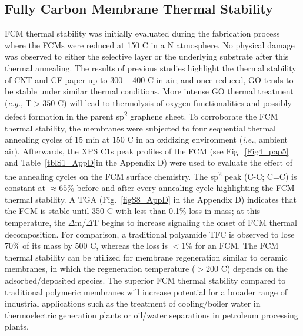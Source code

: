 \subsection{Fully Carbon Membrane Thermal Stability}
FCM thermal stability was initially evaluated during the fabrication process where the FCMs were reduced at 150 \textdegree C in a N atmosphere. No physical damage was observed to either the selective layer or the underlying substrate after this thermal annealing. The results of previous studies highlight the thermal stability of CNT and CF paper up to  $300-400$ \textdegree C in air;\cite{hordy2014high} and once reduced, GO tends to be stable under similar thermal conditions. More intense GO thermal treatment (\textit{e.g.}, T$>350$ \textdegree C) will lead to thermolysis of oxygen functionalities and possibly defect formation in the parent sp\textsuperscript{2} graphene sheet.\cite{bagri2010structural} To corroborate the FCM thermal stability,  the membranes were subjected to four sequential thermal annealing cycles of 15 min at 150 \textdegree C in an oxidizing environment (\textit{i.e.}, ambient air). Afterwards, the XPS C1s peak profiles of the FCM (see Fig.~\ref{Fig4_pap5} and Table~\ref{tblS1_AppD}in the Appendix D) were used to evaluate the effect of the annealing cycles on the FCM surface chemistry. The sp\textsuperscript{2} peak (C-C; C=C) is constant at $\approx65$\% before and after every annealing cycle highlighting the FCM thermal stability. A TGA (Fig.~\ref{figS8_AppD} in the Appendix D) indicates that the FCM is stable until 350 \textdegree C with less than 0.1\% loss in mass; at this temperature, the $\Delta$m/$\Delta$T begins to increase signaling the onset of FCM thermal decomposition. For comparison, a traditional polyamide TFC is observed to lose 70\% of its mass by 500 \textdegree C, whereas the loss is $<1$\% for an FCM. The FCM thermal stability can be utilized for membrane regeneration similar to ceramic membranes, in which the regeneration temperature ($>200$ \textdegree C) depends on the adsorbed/deposited species.\cite{liu2018functionalized} The superior FCM thermal stability compared to traditional polymeric membranes will increase potential for a broader range of industrial applications such as the treatment of cooling/boiler water in thermoelectric generation plants or oil/water separations in petroleum processing plants. 


